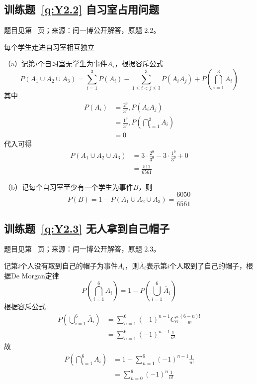 \subsection*{训练题~\ref{q:Y2.2} 自习室占用问题}\label{a:Y2.2}{\small 题目见第~\pageref{q:Y2.2} 页；来源：闫一博公开解答，原题 2.2。}
\begin{solve}
每个学生走进自习室相互独立

（a）记第$i$个自习室无学生为事件$A_i$，根据容斥公式
\[P({A_1} \cup {A_2} \cup {A_3}) = \sum\limits_{i = 1}^3 {P({A_i})}  - \sum\limits_{1 \leqslant i < j \leqslant 3}^3 {P({A_i}{A_j})}  + P(\bigcap\limits_{i = 1}^3 {{A_i}} )\]
其中
\[\begin{aligned}P({A_i}) &= \frac{{{2^9}}}{{{3^9}}},P({A_i}{A_j}) \\&= \frac{{{1^9}}}{{{3^9}}},P(\bigcap\limits_{i = 1}^3 {{A_i}} ) \\&= 0\end{aligned}\]
代入可得
\[\begin{aligned}P({A_1} \cup {A_2} \cup {A_3}) &= 3 \cdot \frac{{{2^9}}}{{{3^9}}} - 3 \cdot \frac{{{1^9}}}{{{3^9}}} + 0 \\&= \frac{{511}}{{6561}}\end{aligned}\]

（b）记每个自习室至少有一个学生为事件$B$，则
\[P(B) = 1 - P({A_1} \cup {A_2} \cup {A_3}) = \frac{{6050}}{{6561}}\]
\end{solve}

\subsection*{训练题~\ref{q:Y2.3} 无人拿到自己帽子}\label{a:Y2.3}{\small 题目见第~\pageref{q:Y2.3} 页；来源：闫一博公开解答，原题 2.3。}
\begin{solve}
记第$i$个人没有取到自己的帽子为事件$A_i$，则$\overline{A}_i$表示第$i$个人取到了自己的帽子，根据De Morgan定律
\[P(\bigcap\limits_{i = 1}^6 {{A_i}} ) = 1 - P(\bigcup\limits_{i = 1}^6 {{{\overline A }_i}} )\]
根据容斥公式
\[\begin{aligned}P(\bigcup\limits_{i = 1}^6 {{{\overline A }_i}} ) &= \sum\limits_{n = 1}^6 {{{( - 1)}^{n - 1}}C_6^n\frac{{(6 - n)!}}{{6!}}}  \\&= \sum\limits_{n = 1}^6 {{{( - 1)}^{n - 1}}\frac{1}{{n!}}} \end{aligned}\]
故
\[\begin{aligned}P(\bigcap\limits_{i = 1}^6 {{A_i}} ) &= 1 - \sum\limits_{n = 1}^6 {{{( - 1)}^{n - 1}}\frac{1}{{n!}}}  \\&= \sum\limits_{n = 0}^6 {{{( - 1)}^n}\frac{1}{{n!}}} \end{aligned}\]
\end{solve}

